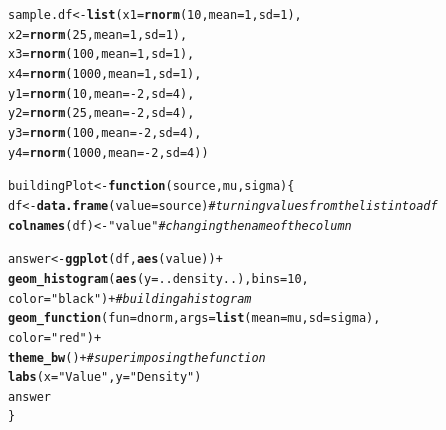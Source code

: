 \documentclass{article}\usepackage[]{graphicx}\usepackage[]{color}
\makeatletter
\newcommand{\hlnum}[1]{\textcolor[rgb]{0.686,0.059,0.569}{#1}}%
\newcommand{\hlstr}[1]{\textcolor[rgb]{0.192,0.494,0.8}{#1}}%
\newcommand{\hlcom}[1]{\textcolor[rgb]{0.678,0.584,0.686}{\textit{#1}}}%
\newcommand{\hlopt}[1]{\textcolor[rgb]{0,0,0}{#1}}%
\newcommand{\hlstd}[1]{\textcolor[rgb]{0.345,0.345,0.345}{#1}}%
\newcommand{\hlkwa}[1]{\textcolor[rgb]{0.161,0.373,0.58}{\textbf{#1}}}%
\newcommand{\hlkwb}[1]{\textcolor[rgb]{0.69,0.353,0.396}{#1}}%
\newcommand{\hlkwc}[1]{\textcolor[rgb]{0.333,0.667,0.333}{#1}}%
\newcommand{\hlkwd}[1]{\textcolor[rgb]{0.737,0.353,0.396}{\textbf{#1}}}%
\newenvironment{kframe}{%
 \def\at@end@of@kframe{}%
 \ifinner\ifhmode%
  \def\at@end@of@kframe{\end{minipage}}%
  \begin{minipage}{\columnwidth}%
 \fi\fi%
 \def\FrameCommand##1{\hskip\@totalleftmargin \hskip-\fboxsep
 \colorbox{shadecolor}{##1}\hskip-\fboxsep
     \hskip-\linewidth \hskip-\@totalleftmargin \hskip\columnwidth}%
 \MakeFramed {\advance\hsize-\width
   \@totalleftmargin\z@ \linewidth\hsize
   \@setminipage}}%
 {\par\unskip\endMakeFramed%
 \at@end@of@kframe}
\newenvironment{knitrout}{}{} %
\makeatother
\begin{document}
\begin{enumerate}
\begin{enumerate}
\begin{knitrout}
\begin{kframe}
\begin{alltt}
        \hlstd{sample.df} \hlkwb{<-} \hlkwd{list}\hlstd{(}\hlkwc{x1}\hlstd{=}\hlkwd{rnorm}\hlstd{(}\hlnum{10}\hlstd{,} \hlkwc{mean}\hlstd{=}\hlnum{1}\hlstd{,} \hlkwc{sd}\hlstd{=}\hlnum{1}\hlstd{),}
                               \hlkwc{x2}\hlstd{=}\hlkwd{rnorm}\hlstd{(}\hlnum{25}\hlstd{,} \hlkwc{mean}\hlstd{=}\hlnum{1}\hlstd{,} \hlkwc{sd}\hlstd{=}\hlnum{1}\hlstd{),}
                               \hlkwc{x3}\hlstd{=}\hlkwd{rnorm}\hlstd{(}\hlnum{100}\hlstd{,} \hlkwc{mean}\hlstd{=}\hlnum{1}\hlstd{,} \hlkwc{sd}\hlstd{=}\hlnum{1}\hlstd{),}
                               \hlkwc{x4}\hlstd{=}\hlkwd{rnorm}\hlstd{(}\hlnum{1000}\hlstd{,} \hlkwc{mean}\hlstd{=}\hlnum{1}\hlstd{,} \hlkwc{sd}\hlstd{=}\hlnum{1}\hlstd{),}
                               \hlkwc{y1}\hlstd{=}\hlkwd{rnorm}\hlstd{(}\hlnum{10}\hlstd{,} \hlkwc{mean}\hlstd{=}\hlopt{-}\hlnum{2}\hlstd{,} \hlkwc{sd}\hlstd{=}\hlnum{4}\hlstd{),}
                               \hlkwc{y2}\hlstd{=}\hlkwd{rnorm}\hlstd{(}\hlnum{25}\hlstd{,} \hlkwc{mean}\hlstd{=}\hlopt{-}\hlnum{2}\hlstd{,} \hlkwc{sd}\hlstd{=}\hlnum{4}\hlstd{),}
                               \hlkwc{y3}\hlstd{=}\hlkwd{rnorm}\hlstd{(}\hlnum{100}\hlstd{,} \hlkwc{mean}\hlstd{=}\hlopt{-}\hlnum{2}\hlstd{,} \hlkwc{sd}\hlstd{=}\hlnum{4}\hlstd{),}
                               \hlkwc{y4}\hlstd{=}\hlkwd{rnorm}\hlstd{(}\hlnum{1000}\hlstd{,} \hlkwc{mean}\hlstd{=}\hlopt{-}\hlnum{2}\hlstd{,} \hlkwc{sd}\hlstd{=}\hlnum{4}\hlstd{))}

        \hlstd{buildingPlot} \hlkwb{<-} \hlkwa{function}\hlstd{(}\hlkwc{source}\hlstd{,} \hlkwc{mu}\hlstd{,} \hlkwc{sigma}\hlstd{)\{}
          \hlstd{df} \hlkwb{<-} \hlkwd{data.frame}\hlstd{(}\hlkwc{value}\hlstd{=source)} \hlcom{#turning values from the list into a df}
          \hlkwd{colnames}\hlstd{(df)} \hlkwb{<-} \hlstr{"value"} \hlcom{#changing the name of the column}

          \hlstd{answer}\hlkwb{<-}\hlkwd{ggplot}\hlstd{(df,} \hlkwd{aes}\hlstd{(value))}\hlopt{+}
            \hlkwd{geom_histogram}\hlstd{(}\hlkwd{aes}\hlstd{(}\hlkwc{y}\hlstd{=..density..),} \hlkwc{bins}\hlstd{=}\hlnum{10}\hlstd{,}
                         \hlkwc{color}\hlstd{=}\hlstr{"black"}\hlstd{)}\hlopt{+} \hlcom{#building a histogram}
            \hlkwd{geom_function}\hlstd{(}\hlkwc{fun}\hlstd{=dnorm,} \hlkwc{args} \hlstd{=} \hlkwd{list}\hlstd{(}\hlkwc{mean} \hlstd{= mu,} \hlkwc{sd} \hlstd{= sigma),}
                \hlkwc{color}\hlstd{=}\hlstr{"red"}\hlstd{)}\hlopt{+}
            \hlkwd{theme_bw}\hlstd{()} \hlopt{+}\hlcom{#superimposing the function}
            \hlkwd{labs}\hlstd{(}\hlkwc{x}\hlstd{=}\hlstr{"Value"}\hlstd{,} \hlkwc{y}\hlstd{=}\hlstr{"Density"}\hlstd{)}
          \hlstd{answer}
        \hlstd{\}}


\end{alltt}
\end{kframe}
\end{knitrout}
\end{enumerate}
\end{enumerate}
\end{document}
